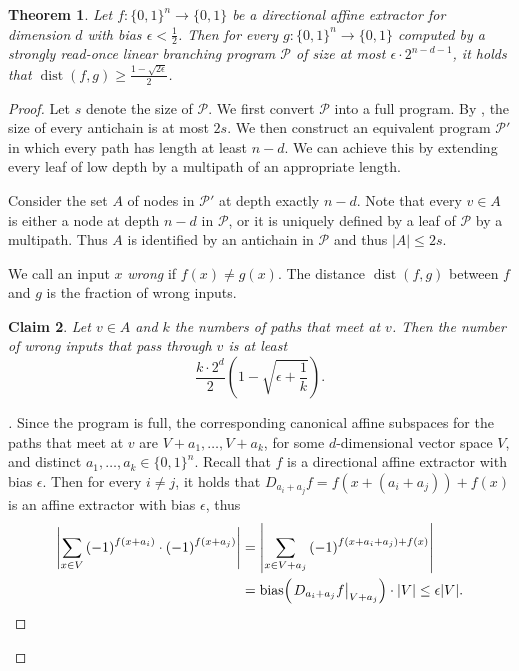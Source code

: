 \documentclass[10pt,a4paper]{article}
\newtheorem{theorem}{Theorem}
\newtheorem{claim}[theorem]{Claim}
\theoremstyle{definition}
\theoremstyle{remark}
\newenvironment{claimproof}[1][\proofname]{\begin{proof}[#1]\renewcommand*{\qedsymbol}{$\blacksquare$}}{\end{proof}}
\DeclareMathOperator{\dist}{dist}
\DeclareMathOperator{\bias}{bias}
\newcommand{\card}[1]{{\left|#1\right|}}
\newcommand{\Q}{{\{0,1\}}}
\newcommand{\calP}{\mathcal{P}}
\newcommand{\restr}[2]{\left.#1\right|_{#2}}
\newcommand{\sreadonce}{strongly read-once}
\begin{document}
\begin{theorem}\label{thm:avg_case_full}
  Let $f\colon \Q^n \to \Q$ be a directional affine extractor for dimension $d$ with bias $\epsilon < \frac{1}{2}$. Then for every $g\colon \Q^n \to \Q$ computed by a \sreadonce{} linear branching program $\calP$ of size at most $\epsilon \cdot 2^{n-d-1}$, it holds that $\dist(f, g) \ge \frac{1-\sqrt{2\epsilon}}{2}$.
\end{theorem}
\begin{proof}
  Let $s$ denote the size of $\calP$. We first convert $\calP$ into a full program. By , the size of every antichain is at most $2s$. We then construct an equivalent program $\calP'$ in which every path has length at least $n-d$. We can achieve this by extending every leaf of low depth by a multipath of an appropriate length. 

  Consider the set $A$ of nodes in $\calP'$ at depth exactly $n-d$. Note that every $v \in A$ is either a node at depth $n - d$ in $\calP$, or it is uniquely defined by a leaf of $\calP$ by a multipath. Thus $A$ is identified by an antichain in $\calP$ and thus $\card{A} \le 2s$.

  We call an input $x$ \emph{wrong} if $f(x) \neq g(x)$. The distance $\dist(f, g)$ between $f$ and $g$ is the fraction of wrong inputs.

  \begin{claim}\label{clm:avg_case_1}
    Let $v \in A$ and $k$ the numbers of paths that meet at $v$. Then the number of wrong inputs that pass through $v$ is at least
    \[
      \frac{k\cdot 2^d}{2} \left(1-\sqrt{\epsilon+\frac{1}{k}}\right).
    \]
  \end{claim}
  \begin{claimproof}
    Since the program is full, the corresponding canonical affine subspaces for the paths that meet at $v$ are $V+a_1, \ldots, V+a_k$, for some $d$-dimensional vector space $V$, and distinct $a_1, \ldots, a_k \in \Q^n$.
    Recall that $f$ is a directional affine extractor with bias $\epsilon$. Then for every $i \neq j$, it holds that $D_{a_i + a_j} f = f(x+(a_i + a_j)) + f(x)$ is an affine extractor with bias $\epsilon$, thus
    \begin{equation}\label{eq:extractor_assumption}
      \begin{aligned}
        \left|\sum_{x \in V} {(-1)}^{f(x+a_i)} \cdot {(-1)}^{f(x+a_j)}\right| &=
        \left|\sum_{x \in V + a_j} {(-1)}^{f(x+a_i+a_j) + f(x)}\right| \\ &=
        \bias\mathopen{}\mathclose\bgroup\left(\restr{D_{a_i + a_j} f}{V+a_j}\aftergroup\egroup\right) \cdot \card{V} \le \epsilon \card{V}.
      \end{aligned}
    \end{equation}


\end{claimproof}
\end{proof}
\end{document}
